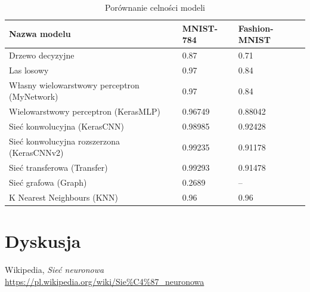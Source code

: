 \documentclass{article}
\begin{document}
\begin{table}[H]
    \centering
    \begin{tabular}{| l | l | l |}
    \hline
    \textbf{Nazwa modelu} & \textbf{MNIST-784} & \textbf{Fashion-MNIST} \\
    \hline
    Drzewo decyzyjne & 0.87 & 0.71 \\
    \hline
    Las losowy & 0.97 & 0.84 \\
    \hline
    Własny wielowarstwowy perceptron (MyNetwork) & 0.97 & 0.84 \\
    \hline
    Wielowarstwowy perceptron (KerasMLP)  & 0.96749 & 0.88042 \\
    \hline
    Sieć konwolucyjna (KerasCNN) & 0.98985 & 0.92428 \\
    \hline
    Sieć konwolucyjna rozszerzona (KerasCNNv2) & 0.99235 & 0.91178 \\
    \hline
    Sieć transferowa (Transfer) & 0.99293 & 0.91478 \\
    \hline
    Sieć grafowa (Graph) & 0.2689 & -- \\
    \hline
    K Nearest Neighbours (KNN) & 0.96 & 0.96 \\
    \hline
    \end{tabular}
    \caption{Porównanie celności modeli}
\end{table}

\section{Dyskusja}

\renewcommand{\refname}{Źródła}
\begin{thebibliography}{100}
    \bibitem{} Wikipedia,
    \textit{Sieć neuronowa}
    \\\url{https://pl.wikipedia.org/wiki/Sie%C4%87_neuronowa}
\end{thebibliography}
\end{document}
